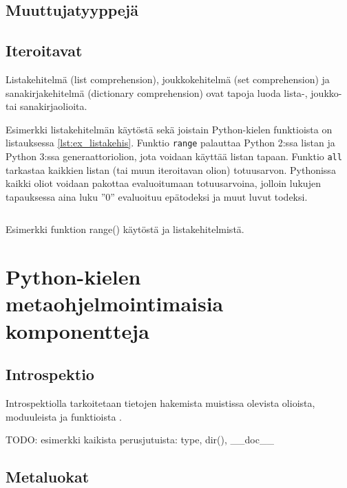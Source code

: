 \documentclass[finnish]{tktltiki2}
\theoremstyle{definition}
\theoremstyle{remark}
\begin{document}

\subsection{Muuttujatyyppejä}

\subsection{Iteroitavat}

Listakehitelmä (list comprehension), joukkokehitelmä (set comprehension) ja sanakirjakehitelmä (dictionary comprehension) ovat tapoja luoda lista-, joukko- tai sanakirjaolioita. 

Esimerkki listakehitelmän käytöstä sekä joistain Python-kielen funktioista on listauksessa \ref{lst:ex_listakehis}. Funktio \verb|range| palauttaa Python 2:ssa listan ja Python 3:ssa generaattoriolion, jota voidaan käyttää listan tapaan. Funktio \verb|all| tarkastaa kaikkien listan (tai muun iteroitavan olion) totuusarvon. Pythonissa kaikki oliot voidaan pakottaa evaluoitumaan totuusarvoina, jolloin lukujen tapauksessa aina luku ''0'' evaluoituu epätodeksi ja muut luvut todeksi.

\begin{listing}
    \inputminted{python}{code/luvut.py}
    \label{lst:ex_listakehis}
    \caption{Esimerkki funktion range() käytöstä ja listakehitelmistä.}
\end{listing}


\section{Python-kielen metaohjelmointimaisia komponentteja}

\subsection{Introspektio}

Introspektiolla tarkoitetaan tietojen hakemista muistissa olevista olioista, moduuleista ja funktioista \cite{dive-into-python}.

TODO: esimerkki kaikista perusjutuista: type, dir(), \_\_doc\_\_

\cite{dive-into-python}

\subsection{Metaluokat}
\end{document}
